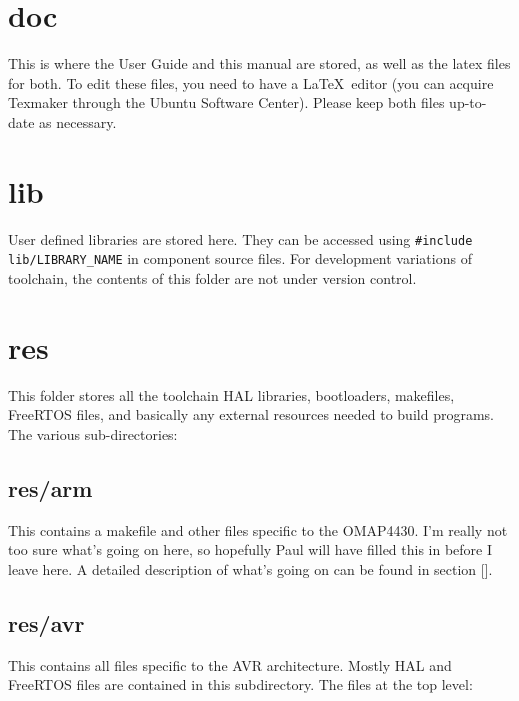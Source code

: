 \documentclass[a4paper, oneside, 11pt, titlepage, onecolumn, openright]{report}
\begin{document}
\section{doc}
			\label{s:doc}
			This is where the User Guide and this manual are stored, as well as the latex files for both. To edit these files, you need to have a \LaTeX\ editor (you can acquire Texmaker through the Ubuntu Software Center). Please keep both files up-to-date as necessary.
			
\section{lib}
			\label{s:lib}
			User defined libraries are stored here. They can be accessed using \texttt{\#include lib/LIBRARY\_NAME} in component source files. For development variations of toolchain, the contents of this folder are not under version control.
			
\section{res}
			\label{s:res}
			This folder stores all the toolchain HAL libraries, bootloaders, makefiles, FreeRTOS files, and basically any external resources needed to build programs. The various sub-directories:
			
\subsection{res/arm}
			\label{ss:res/arm}
			This contains a makefile and other files specific to the OMAP4430. I'm really not too sure what's going on here, so hopefully Paul will have filled this in before I leave here. A detailed description of what's going on can be found in section [].
			
\subsection{res/avr}
			\label{ss:res/avr}
			This contains all files specific to the AVR architecture. Mostly HAL and FreeRTOS files are contained in this subdirectory. The files at the top level:
			
\end{document}
